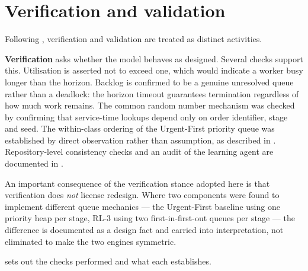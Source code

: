 \section{Verification and validation}
\label{sec:verification}

Following \citet{sargent2008}, verification and validation are treated as distinct activities.

\textbf{Verification} asks whether the model behaves as designed. Several checks support this.
Utilisation is asserted not to exceed one, which would indicate a worker busy longer than the
horizon. Backlog is confirmed to be a genuine unresolved queue rather than a deadlock: the
horizon timeout guarantees termination regardless of how much work remains. The common random
number mechanism was checked by confirming that service-time lookups depend only on order
identifier, stage and seed. The within-class ordering of the Urgent-First priority queue was
established by direct observation rather than assumption, as described in
. Repository-level consistency checks and an audit of the learning agent
are documented in .

An important consequence of the verification stance adopted here is that verification does
\emph{not} license redesign. Where two components were found to implement different queue
mechanics --- the Urgent-First baseline using one priority heap per stage, RL-3 using two
first-in-first-out queues per stage --- the difference is documented as a design fact and
carried into interpretation, not eliminated to make the two engines symmetric.

 sets out the checks performed and what each establishes.

